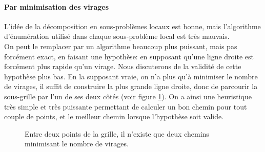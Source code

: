 \paragraph{Par minimisation des virages}
L'idée de la décomposition en sous-problèmes locaux est bonne, mais l'algorithme d'énumération utilisé dans chaque sous-problème local est très mauvais.\\
On peut le remplacer par un algorithme beaucoup plus puissant, mais pas forcément exact, en faisant une hypothèse: en supposant qu'une ligne droite est forcément plus rapide qu'un virage. Nous discuterons de la validité de cette hypothèse plus bas. En la supposant vraie, on n'a plus qu'à minimiser le nombre de virages, il suffit de construire la plus grande ligne droite, donc de parcourir la sous-grille par l'un de ses deux côtés (voir figure \ref{fig:grille5}). On a ainsi une heuristique très simple et très puissante permettant de calculer un bon chemin pour tout couple de points, et le meilleur chemin lorsque l'hypothèse soit valide.\\
\begin{figure}
	\centering
	
	\caption{Entre deux points de la grille, il n'existe que deux chemins minimisant le nombre de virages.}
	\label{fig:grille5}
\end{figure}
